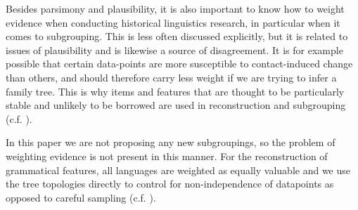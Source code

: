 \documentclass[a4paper,10pt]{article} %
\begin{document}
Besides parsimony and plausibility, it is also important to know how to weight evidence when conducting historical linguistics research, in particular when it comes to subgrouping. This is less often discussed explicitly, but it is related to issues of plausibility and is likewise a source of disagreement. It is for example possible that certain data-points are more susceptible to contact-induced change than others, and should therefore carry less weight if we are trying to infer a family tree. This is why items and features that are thought to be particularly stable and unlikely to be borrowed are used in reconstruction and subgrouping (c.f. \citet{pawley_2009_solomons}).

In this paper we are not proposing any new subgroupings, so the problem of weighting evidence is not present in this manner. For the reconstruction of grammatical features, all languages are weighted as equally valuable and we use the tree topologies directly to control for non-independence of datapoints as opposed to careful sampling (c.f. \cite{ross2004morphosyntactic}).


\end{document}
